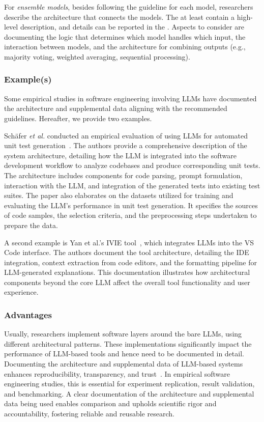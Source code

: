 For \emph{ensemble models}, besides following the \modelversion guideline for each model, researchers \must describe the architecture that connects the models.
The \paper \must at least contain a high-level description, and details can be reported in the \supplementarymaterial.
Aspects to consider are documenting the logic that determines which model handles which input, the interaction between models, and the architecture for combining outputs (e.g., majority voting, weighted averaging, sequential processing).


\subsubsection{Example(s)}

Some empirical studies in software engineering involving LLMs have documented the architecture and supplemental data aligning with the recommended guidelines. Hereafter, we provide two examples.

Sch{\"{a}}fer \textit{et al.} conducted an empirical evaluation of using LLMs for automated unit test generation~\cite{DBLP:journals/tse/SchaferNET24}. The authors provide a comprehensive description of the system architecture, detailing how the LLM is integrated into the software development workflow to analyze codebases and produce corresponding unit tests. The architecture includes components for code parsing, prompt formulation, interaction with the LLM, and integration of the generated tests into existing test suites. The paper also elaborates on the datasets utilized for training and evaluating the LLM's performance in unit test generation. It specifies the sources of code samples, the selection criteria, and the preprocessing steps undertaken to prepare the data.

A second example is Yan et al.'s IVIE tool~\cite{DBLP:conf/chi/YanHWH24}, which integrates LLMs into the VS Code interface. The authors document the tool architecture, detailing the IDE integration, context extraction from code editors, and the formatting pipeline for LLM-generated explanations. This documentation illustrates how architectural components beyond the core LLM affect the overall tool functionality and user experience.

\subsubsection{Advantages}

Usually, researchers implement software layers around the bare LLMs, using different architectural patterns.
These implementations significantly impact the performance of LLM-based tools and hence need to be documented in detail.
Documenting the architecture and supplemental data of LLM-based systems enhances reproducibility, transparency, and trust~\cite{DBLP:journals/software/LuZXXW24}.
In empirical software engineering studies, this is essential for experiment replication, result validation, and benchmarking. A clear documentation of the architecture and supplemental data being used enables comparison and upholds scientific rigor and accountability, fostering reliable and reusable research.

